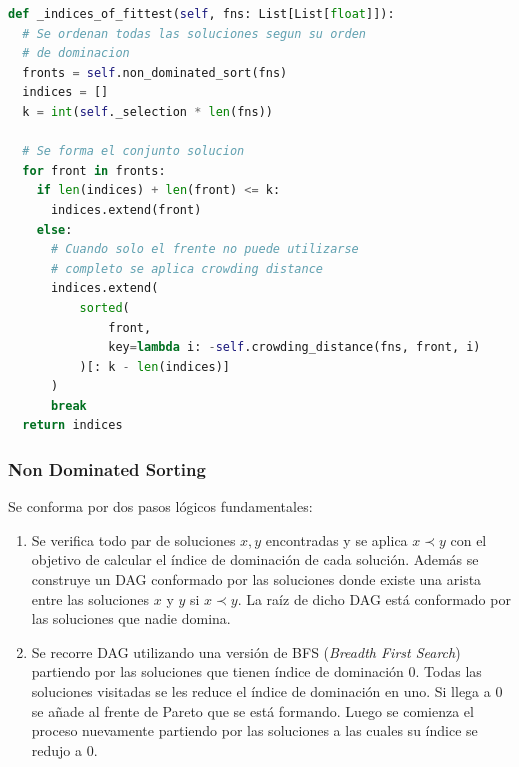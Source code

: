 \begin{lstlisting}[caption=Nueva ordenaci\'on, language=Python]
def _indices_of_fittest(self, fns: List[List[float]]):
  # Se ordenan todas las soluciones segun su orden
  # de dominacion
  fronts = self.non_dominated_sort(fns)
  indices = []
  k = int(self._selection * len(fns))

  # Se forma el conjunto solucion
  for front in fronts:
    if len(indices) + len(front) <= k:
      indices.extend(front)
    else:
      # Cuando solo el frente no puede utilizarse
      # completo se aplica crowding distance
      indices.extend(
          sorted(
              front,
              key=lambda i: -self.crowding_distance(fns, front, i)
          )[: k - len(indices)]
      )
      break
  return indices
\end{lstlisting}

\subsubsection{Non Dominated Sorting}
Se conforma por dos pasos l\'ogicos fundamentales:
\begin{enumerate}
    \item Se verifica todo par de soluciones $x, y$ encontradas y se aplica $x \prec y$ con el objetivo de calcular el \'indice de dominaci\'on de cada soluci\'on. Adem\'as se construye un DAG conformado por las soluciones donde existe una arista entre las soluciones $x$ y $y$ si $x \prec y$. La ra\'iz de dicho DAG est\'a conformado por las soluciones que nadie domina.
    \item Se recorre DAG utilizando una versi\'on de BFS (\textit{Breadth First Search}) partiendo por las soluciones que tienen \'indice de dominaci\'on 0. Todas las soluciones visitadas se les reduce el \'indice de dominaci\'on en uno. Si llega a 0 se a\~nade al frente de Pareto que se est\'a formando. Luego se comienza el proceso nuevamente partiendo por las soluciones a las cuales su \'indice se redujo a 0.
\end{enumerate}

